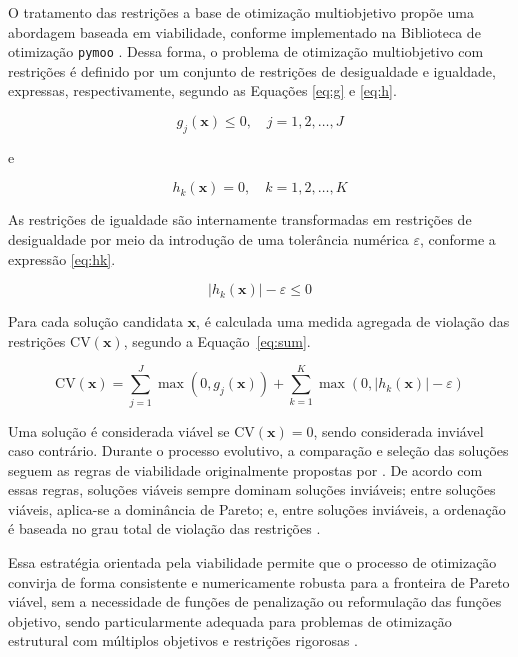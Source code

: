 O tratamento das restrições a base de otimização multiobjetivo propõe uma abordagem baseada em viabilidade, conforme implementado na Biblioteca de otimização \texttt{pymoo} \parencite{blank2020}. Dessa forma, o problema de otimização multiobjetivo com restrições é definido por um conjunto de restrições de desigualdade e igualdade, expressas, respectivamente, segundo as Equações \eqref{eq:g} e \eqref{eq:h}.

\begin{equation}
g_j(\mathbf{x}) \leq 0, \quad j = 1,2,\ldots,J
\label{eq:g}
\end{equation}

e

\begin{equation}
h_k(\mathbf{x}) = 0, \quad k = 1,2,\ldots,K
\label{eq:h}
\end{equation}

As restrições de igualdade são internamente transformadas em restrições de desigualdade por meio da introdução de uma tolerância numérica $\varepsilon$, conforme a expressão \eqref{eq:hk}.

\begin{equation}
|h_k(\mathbf{x})| - \varepsilon \leq 0
\label{eq:hk}
\end{equation}

Para cada solução candidata $\mathbf{x}$, é calculada uma medida agregada de violação das restrições $\mathrm{CV}(\mathbf{x})$, segundo a Equação~\eqref{eq:sum}.

\begin{equation}
\mathrm{CV}(\mathbf{x}) =
\sum_{j=1}^{J} \max\left(0, g_j(\mathbf{x})\right)
+
\sum_{k=1}^{K} \max\left(0, |h_k(\mathbf{x})| - \varepsilon \right)
\label{eq:sum}
\end{equation}

Uma solução é considerada viável se $\mathrm{CV}(\mathbf{x}) = 0$, sendo considerada inviável caso contrário. Durante o processo evolutivo, a comparação e seleção das soluções seguem as regras de viabilidade originalmente propostas por \textcite{DEB2009}. De acordo com essas regras, soluções viáveis sempre dominam soluções inviáveis; entre soluções viáveis, aplica-se a dominância de Pareto; e, entre soluções inviáveis, a ordenação é baseada no grau total de violação das restrições \parencite{DEB2009}.

Essa estratégia orientada pela viabilidade permite que o processo de otimização convirja de forma consistente e numericamente robusta para a fronteira de Pareto viável, sem a necessidade de funções de penalização ou reformulação das funções objetivo, sendo particularmente adequada para problemas de otimização estrutural com múltiplos objetivos e restrições rigorosas \parencite{blank2020}.

